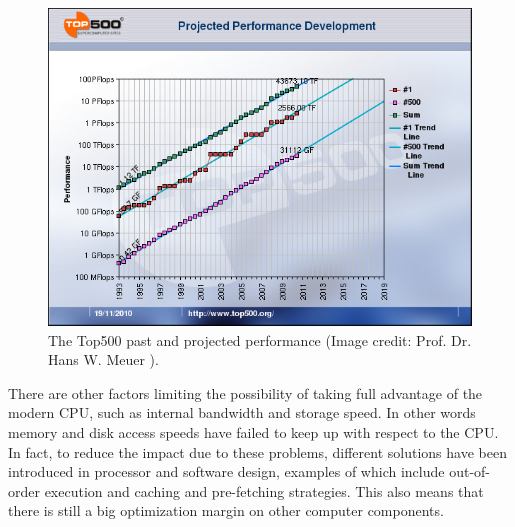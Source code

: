 \begin{figure}
\centering
\includegraphics[scale=0.50]{./Sec_ET_ScienceCase/top500graph.png}
\caption{The Top500 past and projected performance (Image credit:
Prof. Dr. Hans W. Meuer ).} \label{fig:top500}
\end{figure}

There are other factors limiting the possibility of taking full 
advantage of the modern CPU, such as internal bandwidth and 
storage speed. In other words memory and disk access speeds have 
failed to keep up with respect to the CPU. In fact, to reduce the 
impact due to these problems, different solutions have been 
introduced in processor and software design, examples of which
include out-of-order execution and caching and pre-fetching strategies. 
This also means that there is still a  big optimization margin 
on other computer components.

